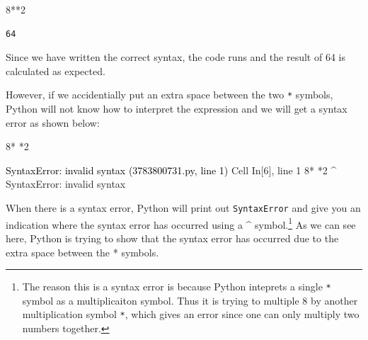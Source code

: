 \documentclass[
  letterpaper,
  DIV=11,
  numbers=noendperiod]{scrreprt}
\newenvironment{Shaded}{\begin{snugshade}}{\end{snugshade}}
\newcommand{\DecValTok}[1]{\textcolor[rgb]{0.68,0.00,0.00}{#1}}
\newcommand{\OperatorTok}[1]{\textcolor[rgb]{0.37,0.37,0.37}{#1}}
\begin{document}
\begin{Shaded}
\begin{Highlighting}[]
\DecValTok{8}\OperatorTok{**}\DecValTok{2}
\end{Highlighting}
\end{Shaded}

\begin{verbatim}
64
\end{verbatim}

Since we have written the correct syntax, the code runs and the result
of 64 is calculated as expected.

However, if we accidentially put an extra space between the two
\texttt{*} symbols, Python will not know how to interpret the expression
and we will get a syntax error as shown below:

\begin{Shaded}
\begin{Highlighting}[]
\DecValTok{8}\OperatorTok{*} \OperatorTok{*}\DecValTok{2}
\end{Highlighting}
\end{Shaded}

\begin{Highlighting}
\textcolor{black}{SyntaxError: invalid syntax (3783800731.py, line 1)}
\textcolor{black}{  }\textcolor{QuartoInternalColor1}{Cell}\textcolor{QuartoInternalColor2}{}\textcolor{QuartoInternalColor1}{ }\textcolor{QuartoInternalColor2}{}\textcolor{QuartoInternalColor3}{In[6]}\textcolor{QuartoInternalColor2}{}\textcolor{QuartoInternalColor3}{, line 1}\textcolor{QuartoInternalColor2}{}
\textcolor{QuartoInternalColor2}{}\textcolor{QuartoInternalColor4}{    }\textcolor{QuartoInternalColor2}{}\textcolor{QuartoInternalColor4}{8* *2}\textcolor{QuartoInternalColor2}{}
\textcolor{QuartoInternalColor2}{       ^}
\textcolor{QuartoInternalColor2}{}\textcolor{QuartoInternalColor4}{SyntaxError}\textcolor{QuartoInternalColor2}{}\textcolor{QuartoInternalColor4}{:}\textcolor{QuartoInternalColor2}{ invalid syntax}
\end{Highlighting}

When there is a syntax error, Python will print out \texttt{SyntaxError}
and give you an indication where the syntax error has occurred using a
\^{} symbol.\footnote{The reason this is a syntax error is because
  Python inteprets a single \texttt{*} symbol as a multiplicaiton
  symbol. Thus it is trying to multiple 8 by another multiplication
  symbol \texttt{*}, which gives an error since one can only multiply
  two numbers together.} As we can see here, Python is trying to show
that the syntax error has occurred due to the extra space between the *
symbols.
\end{document}
